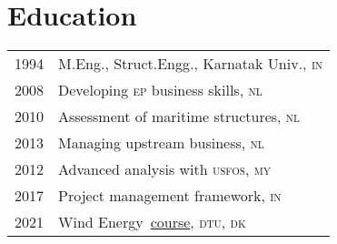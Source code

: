 \section*{Education} %
\label{sec:edu}

\begin{tabular}{l l}
  1994 & M.Eng., Struct.Engg., Karnatak Univ., \textsc{in} \\
  2008 & Developing \textsc{ep} business skills, \textsc{nl} \\
  2010 & Assessment of maritime structures, \textsc{nl} \\
  2013 & Managing upstream business, \textsc{nl} \\
  2012 & Advanced analysis with \textsc{usfos}, \textsc{my} \\
  2017 & Project management framework, \textsc{in} \\
  2021 & Wind Energy~\href{https://www.coursera.org/account/accomplishments/certificate/Y9CRZSXUSTWB}{course}, \textsc{dtu}, \textsc{dk} \\
\end{tabular}

